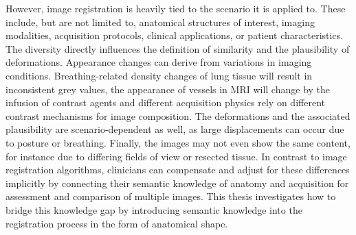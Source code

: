 However, image registration is heavily tied to the scenario it is applied to. These include, but are not limited to, anatomical structures of interest, imaging modalities, acquisition protocols, clinical applications, or patient characteristics. The diversity directly influences the definition of similarity and the plausibility of deformations. Appearance changes can derive from variations in imaging conditions. Breathing-related density changes of lung tissue will result in inconsistent grey values, the appearance of vessels in MRI will change by the infusion of contrast agents and different acquisition physics rely on different contrast mechanisms for image composition. The deformations and the associated plausibility are scenario-dependent as well, as large displacements can occur due to posture or breathing. Finally, the images may not even show the same content, for instance due to differing fields of view or resected tissue. In contrast to image registration algorithms, clinicians can compensate and adjust for these differences implicitly by connecting their semantic knowledge of anatomy and acquisition for assessment and comparison of multiple images. This thesis investigates how to bridge this knowledge gap by introducing semantic knowledge into the registration process in the form of anatomical shape. 
